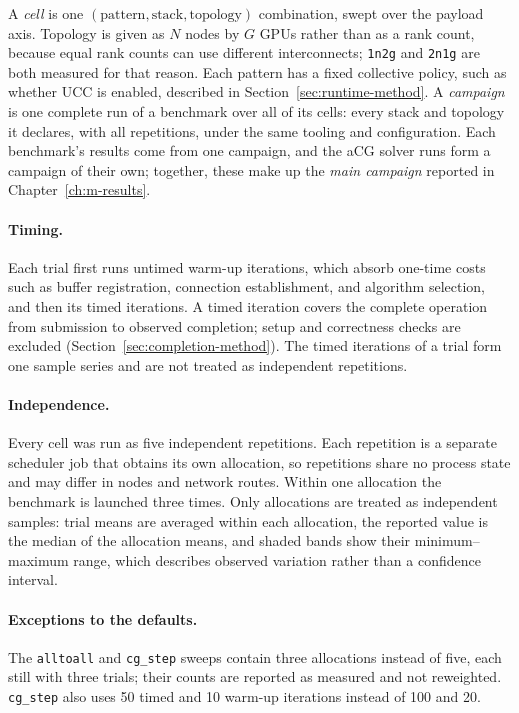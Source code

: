 A \emph{cell} is one $(\text{pattern}, \text{stack}, \text{topology})$ combination, swept over the payload axis. Topology is given as $N$ nodes by $G$ GPUs rather than as a rank count, because equal rank counts can use different interconnects; \texttt{1n2g} and \texttt{2n1g} are both measured for that reason. Each pattern has a fixed collective policy, such as whether UCC is enabled, described in Section~\ref{sec:runtime-method}. A \emph{campaign} is one complete run of a benchmark over all of its cells: every stack and topology it declares, with all repetitions, under the same tooling and configuration. Each benchmark's results come from one campaign, and the aCG solver runs form a campaign of their own; together, these make up the \emph{main campaign} reported in Chapter~\ref{ch:m-results}.

\paragraph{Timing.} Each trial first runs untimed warm-up iterations, which absorb one-time costs such as buffer registration, connection establishment, and algorithm selection, and then its timed iterations. A timed iteration covers the complete operation from submission to observed completion; setup and correctness checks are excluded (Section~\ref{sec:completion-method}). The timed iterations of a trial form one sample series and are not treated as independent repetitions.

\paragraph{Independence.} Every cell was run as five independent repetitions. Each repetition is a separate scheduler job that obtains its own allocation, so repetitions share no process state and may differ in nodes and network routes. Within one allocation the benchmark is launched three times. Only allocations are treated as independent samples: trial means are averaged within each allocation, the reported value is the median of the allocation means, and shaded bands show their minimum--maximum range, which describes observed variation rather than a confidence interval.

\paragraph{Exceptions to the defaults.} The \texttt{alltoall} and \texttt{cg\_step} sweeps contain three allocations instead of five, each still with three trials; their counts are reported as measured and not reweighted. \texttt{cg\_step} also uses 50 timed and 10 warm-up iterations instead of 100 and 20.

